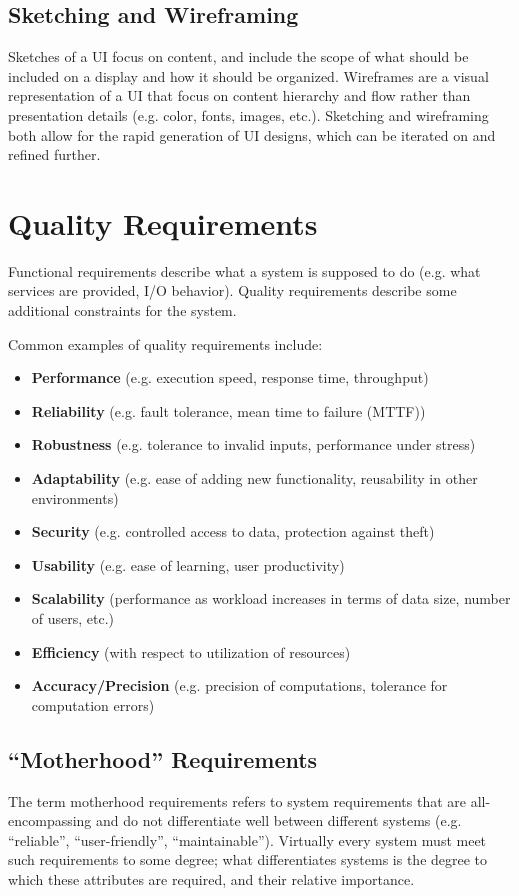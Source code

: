 \documentclass[12pt,titlepage]{article}
\let\stdsection\section
\renewcommand\section{\clearpage\stdsection}
\begin{document}
      \subsection{Sketching and Wireframing}
        Sketches of a UI focus on content, and include the scope of what should be included on a display and how it should be organized. Wireframes are a visual representation of a UI
        that focus on content hierarchy and flow rather than presentation details (e.g. color, fonts, images, etc.). Sketching and wireframing both allow for the rapid generation of
        UI designs, which can be iterated on and refined further.

  \section{Quality Requirements}
    Functional requirements describe what a system is supposed to do (e.g. what services are provided, I/O behavior). Quality requirements describe some
    additional constraints for the system.

    Common examples of quality requirements include:
    \begin{itemize}
      \item \textbf{Performance} (e.g. execution speed, response time, throughput)
      \item \textbf{Reliability} (e.g. fault tolerance, mean time to failure (MTTF))
      \item \textbf{Robustness} (e.g. tolerance to invalid inputs, performance under stress)
      \item \textbf{Adaptability} (e.g. ease of adding new functionality, reusability in other environments)
      \item \textbf{Security} (e.g. controlled access to data, protection against theft)
      \item \textbf{Usability} (e.g. ease of learning, user productivity)
      \item \textbf{Scalability} (performance as workload increases in terms of data size, number of users, etc.)
      \item \textbf{Efficiency} (with respect to utilization of resources)
      \item \textbf{Accuracy/Precision} (e.g. precision of computations, tolerance for computation errors)
    \end{itemize}

    \subsection{``Motherhood'' Requirements}
      The term motherhood requirements refers to system requirements that are all-encompassing and do not differentiate well between different systems
      (e.g. ``reliable'', ``user-friendly'', ``maintainable''). Virtually every system must meet such requirements to some degree; what differentiates
      systems is the degree to which these attributes are required, and their relative importance.
\end{document}
